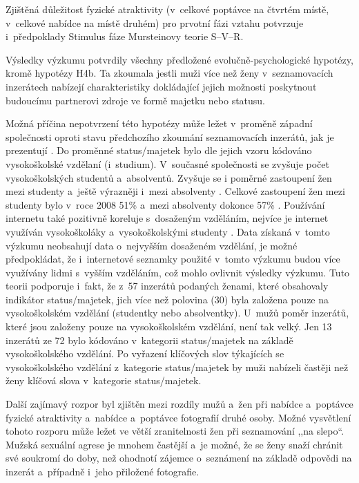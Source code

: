\documentclass[a4paper, 12pt, notitlepage, oneside, numbers=noenddot]{report}
\begin{document}
Zjištěná důležitost fyzické atraktivity (v~celkové poptávce na čtvrtém
místě, v~celkové nabídce na místě druhém) pro prvotní fázi vztahu
potvrzuje i~předpoklady Stimulus fáze Mursteinovy
\citeyearpar{Murstein1970} teorie S--V--R.

Výsledky výzkumu potvrdily všechny předložené evolučně-psychologické
hypotézy, kromě hypotézy H4b.  Ta zkoumala jestli muži více než ženy
v~seznamovacích inzerátech nabízejí charakteristiky dokládající jejich
možnosti poskytnout budoucímu partnerovi zdroje ve formě majetku nebo
statusu.

Možná příčina nepotvrzení této hypotézy může ležet v~proměně západní
společnosti oproti stavu předchozího zkoumání seznamovacích inzerátů,
jak je prezentují \citet{BarrettDunbarLycett2007}.  Do proměnné
status/majetek bylo dle jejich vzoru kódováno vysokoškolské vzdělaní
(i~studium).  V~současné společnosti se zvyšuje počet vysokoškolských
studentů a~absolventů.  Zvyšuje se i poměrné zastoupení žen mezi
studenty a~ještě výrazněji i~mezi absolventy \citep{CSU2010}.  Celkové
zastoupení žen mezi studenty bylo v~roce 2008 51\% a~mezi absolventy
dokonce 57\% \citep{CSU2010}.  Používání internetu také pozitivně
koreluje s~dosaženým vzděláním, nejvíce je internet využíván
vysokoškoláky a~vysokoškolskými studenty \citep{GalaczSmahel2007}.
Data získaná v~tomto výzkumu neobsahují data o~nejvyšším dosaženém
vzdělání, je možné předpokládat, že i~internetové seznamky použité
v~tomto výzkumu budou více využívány lidmi s~vyšším vzděláním, což
mohlo ovlivnit výsledky výzkumu.  Tuto teorii podporuje i~fakt, že
z~57 inzerátů podaných ženami, které obsahovaly indikátor
status/majetek, jich více než polovina (30) byla založena pouze na
vysokoškolském vzdělání (studentky nebo absolventky).  U~mužů poměr
inzerátů, které jsou založeny pouze na vysokoškolském vzdělání, není
tak velký.  Jen 13 inzerátů ze 72 bylo kódováno v~kategorii
status/majetek na základě vysokoškolského vzdělání.  Po vyřazení
klíčových slov týkajících se vysokoškolského vzdělání z~kategorie
status/majetek by muži nabízeli častěji než ženy klíčová slova
v~kategorie status/majetek.

Další zajímavý rozpor byl zjištěn mezi rozdíly mužů a~žen při nabídce
a~poptávce fyzické atraktivity a~nabídce a~poptávce fotografií druhé
osoby.  Možné vysvětlení tohoto rozporu může ležet ve větší
zranitelnosti žen při seznamování ,,na slepo``. Mužská sexuální agrese
je mnohem častější a~je možné, že se ženy snaží chránit své soukromí
do doby, než ohodnotí zájemce o~seznámení na základě odpovědi na
inzerát a~případně i~jeho přiložené fotografie.
\end{document}
